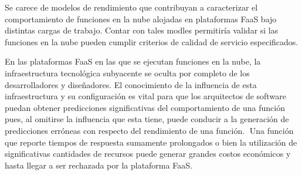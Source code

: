 Se carece de modelos de rendimiento que contribuyan a caracterizar el comportamiento de funciones en la nube alojadas en plataformas FaaS bajo distintas cargas de trabajo. Contar con tales modles permitiría validar si las funciones en la nube pueden cumplir criterios de calidad de servicio especificados.


En las plataformas FaaS en las que se ejecutan funciones en la nube, la infraestructura tecnológica subyacente se oculta por completo de los desarrolladores y diseñadores. El conocimiento de la influencia de esta infraestructura y su configuración es vital para que los arquitectos de software puedan obtener predicciones significativas del comportamiento de una función pues, al omitirse la influencia que esta tiene, puede conducir a la generación de predicciones erróneas con respecto del rendimiento de una función. Una función que reporte tiempos de respuesta sumamente prolongados o bien la utilización de significativas cantidades de recursos puede generar grandes costos económicos y hasta llegar a ser rechazada por la plataforma FaaS.


